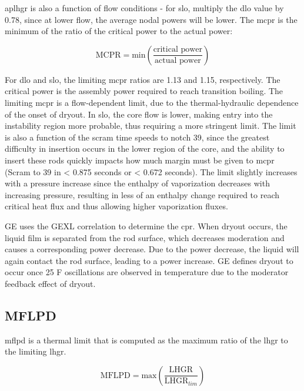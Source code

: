 \documentclass[10pt]{article}
\begin{document}
\gls{aplhgr} is also a function of flow conditions - for \gls{slo}, multiply the \gls{dlo} value by 0.78, since at lower flow, the average nodal powers will be lower. The \gls{mcpr} is the minimum of the ratio of the critical power to the actual power:

\begin{equation}
\textrm{MCPR}=\textrm{min}\left(\frac{\textrm{critical power}}{\textrm{actual power}}\right)
\end{equation}

For \gls{dlo} and \gls{slo}, the limiting \gls{mcpr} ratios are 1.13 and 1.15, respectively. The critical power is the assembly power required to reach transition boiling. The limiting \gls{mcpr} is a flow-dependent limit, due to the thermal-hydraulic dependence of the onset of dryout. In \gls{slo}, the core flow is lower, making entry into the instability region more probable, thus requiring a more stringent limit. The limit is also a function of the scram time speeds to notch 39, since the greatest difficulty in insertion occurs in the lower region of the core, and the ability to insert these rods quickly impacts how much margin must be given to \gls{mcpr} (Scram to 39 in < 0.875 seconds or < 0.672 seconds). The limit slightly increases with a pressure increase since the enthalpy of vaporization decreases with increasing pressure, resulting in less of an enthalpy change required to reach critical heat flux and thus allowing higher vaporization fluxes.

GE uses the GEXL correlation to determine the \gls{cpr}. When dryout occurs, the liquid film is separated from the rod surface, which decreases moderation and causes a corresponding power decrease. Due to the power decrease, the liquid will again contact the rod surface, leading to a power increase. GE defines dryout to occur once 25 \degree F oscillations are observed in temperature due to the moderator feedback effect of dryout. 

\subsection{MFLPD}

\gls{mflpd} is a thermal limit that is computed as the maximum ratio of the \gls{lhgr} to the limiting \gls{lhgr}. 

\begin{equation}
\textrm{MFLPD}=\textrm{max}\left(\frac{\textrm{LHGR}}{\textrm{LHGR}_{lim}}\right)
\end{equation}
\end{document}
